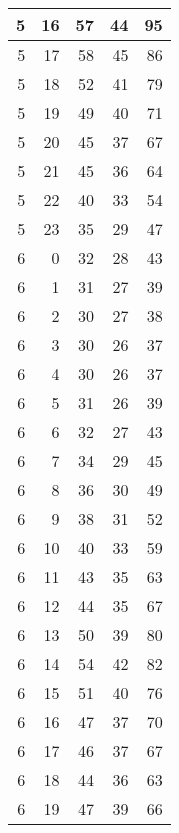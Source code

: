 \begin{longtable}{|r|r|r|r|r|}
    \hline
    5     & 16    & 57    & 44    & 95 \\
    \hline
    5     & 17    & 58    & 45    & 86 \\
    \hline
    5     & 18    & 52    & 41    & 79 \\
    \hline
    5     & 19    & 49    & 40    & 71 \\
    \hline
    5     & 20    & 45    & 37    & 67 \\
    \hline
    5     & 21    & 45    & 36    & 64 \\
    \hline
    5     & 22    & 40    & 33    & 54 \\
    \hline
    5     & 23    & 35    & 29    & 47 \\
    \hline
    6     & 0     & 32    & 28    & 43 \\
    \hline
    6     & 1     & 31    & 27    & 39 \\
    \hline
    6     & 2     & 30    & 27    & 38 \\
    \hline
    6     & 3     & 30    & 26    & 37 \\
    \hline
    6     & 4     & 30    & 26    & 37 \\
    \hline
    6     & 5     & 31    & 26    & 39 \\
    \hline
    6     & 6     & 32    & 27    & 43 \\
    \hline
    6     & 7     & 34    & 29    & 45 \\
    \hline
    6     & 8     & 36    & 30    & 49 \\
    \hline
    6     & 9     & 38    & 31    & 52 \\
    \hline
    6     & 10    & 40    & 33    & 59 \\
    \hline
    6     & 11    & 43    & 35    & 63 \\
    \hline
    6     & 12    & 44    & 35    & 67 \\
    \hline
    6     & 13    & 50    & 39    & 80 \\
    \hline
    6     & 14    & 54    & 42    & 82 \\
    \hline
    6     & 15    & 51    & 40    & 76 \\
    \hline
    6     & 16    & 47    & 37    & 70 \\
    \hline
    6     & 17    & 46    & 37    & 67 \\
    \hline
    6     & 18    & 44    & 36    & 63 \\
    \hline
    6     & 19    & 47    & 39    & 66 \\

\end{longtable}
